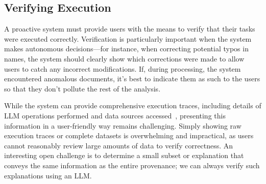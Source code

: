 \subsection{Verifying Execution}\label{sec:verification}

A proactive system must provide users with the means to verify that their tasks were executed correctly. Verification is particularly important when the system makes autonomous decisions---for instance, when correcting potential typos in names, the system should clearly show which corrections were made to allow users to catch any incorrect modifications. 
If, during processing, the system encountered anomalous documents, it's best to indicate them as such to the users so that they don't pollute the rest of the analysis.

While the system can provide comprehensive execution traces, including details of LLM operations performed and data sources accessed~\cite{tan2007provenance}, presenting this information in a user-friendly way remains challenging. Simply showing raw execution traces or complete datasets is overwhelming and impractical, as users cannot reasonably review large amounts of data to verify correctness. An interesting open challenge
is to determine a small subset or explanation that conveys the same information as the entire provenance; we can always verify such explanations using an LLM. 




